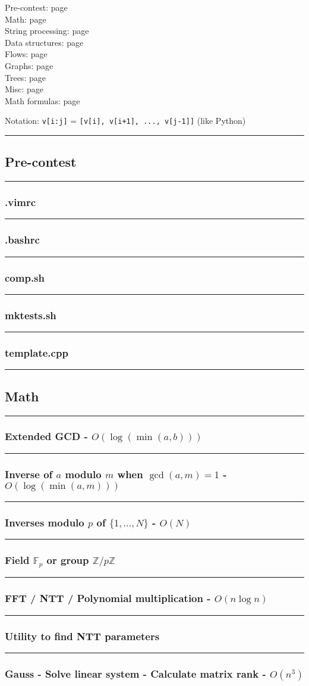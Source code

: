 \documentclass[landscape,a4paper,twocolumn,10pt]{report}
\renewcommand{\line}{\noindent\rule{\linewidth}{1pt}}
\newcommand{\algosection}[1]{\line \subsection*{#1}}
\newcommand{\algorithm}[1]{\line \subsubsection*{#1}}
\begin{document}
\footnotesize

\noindent
Pre-contest: page \pageref{precontest} \\
Math: page \pageref{math} \\
String processing: page \pageref{string} \\
Data structures: page \pageref{datastruct} \\
Flows: page \pageref{flows} \\
Graphs: page \pageref{graphs} \\
Trees: page \pageref{trees} \\
Misc: page \pageref{misc} \\
Math formulas: page \pageref{mathformulas}

\noindent
Notation: \verb#v[i:j]# = \verb#[v[i], v[i+1], ..., v[j-1]]# (like Python)

\algosection{Pre-contest}
\label{precontest}

\algorithm{.vimrc}


\algorithm{.bashrc}


\algorithm{comp.sh}


\algorithm{mktests.sh}


\algorithm{template.cpp}


\algosection{Math}
\label{math}

\algorithm{Extended GCD - $O(\log(\min(a, b)))$}


\algorithm{Inverse of $a$ modulo $m$ when $\operatorname{gcd}(a, m) = 1$ - $O(\log(\min(a, m)))$}


\algorithm{Inverses modulo $p$ of $\{1, \dots, N\}$ - $O(N)$}


\algorithm{Field $\mathbb F_p$ or group $\mathbb Z/p\mathbb Z$}


\algorithm{FFT / NTT / Polynomial multiplication - $O(n \log n)$}


\algorithm{Utility to find NTT parameters}


\algorithm{Gauss - Solve linear system - Calculate matrix rank - $O(n^3)$}

\end{document}
